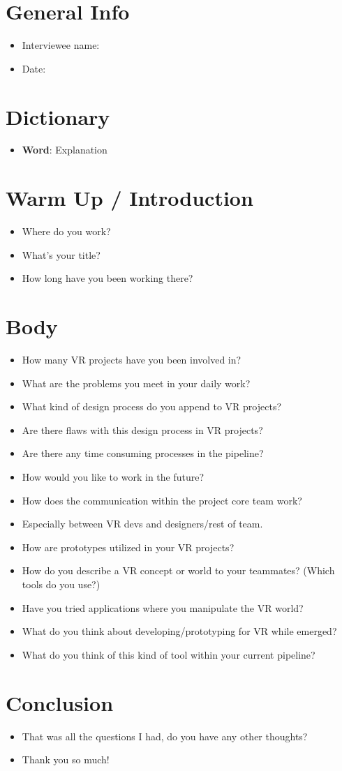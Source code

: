 \section{General Info}
{\renewcommand\labelitemi{}
\begin{itemize}
  \item Interviewee name:
  \item Date:
\end{itemize}
\section{Dictionary}
\begin{itemize}
  \item \textbf{Word}: Explanation
\end{itemize}

\section{Warm Up / Introduction}
\begin{itemize}
\item
Where do you work?
\item
What's your title?
\item
How long have you been working there?

\end{itemize}
\section{Body}
\begin{itemize}
\item
How many VR projects have you been involved in?
\item
What are the problems you meet in your daily work?
\item
What kind of design process do you append to VR projects?
\item
Are there flaws with this design process in VR projects?
\item
Are there any time consuming processes in the pipeline?
\item
How would you like to work in the future?
\item
How does the communication within the project core team work?
\item
Especially between VR devs and designers/rest of team.
\item
How are prototypes utilized in your VR projects?
\item
How do you describe a VR concept or world to your teammates? (Which tools do you use?)
\item
Have you tried applications where you manipulate the VR world?
\item
What do you think about developing/prototyping for VR while emerged?
\item
What do you think of this kind of tool within your current pipeline?
\end{itemize}
\section{Conclusion}
\begin{itemize}
  \item
That was all the questions I had, do you have any other thoughts?
\item
Thank you so much!
\end{itemize}
}
